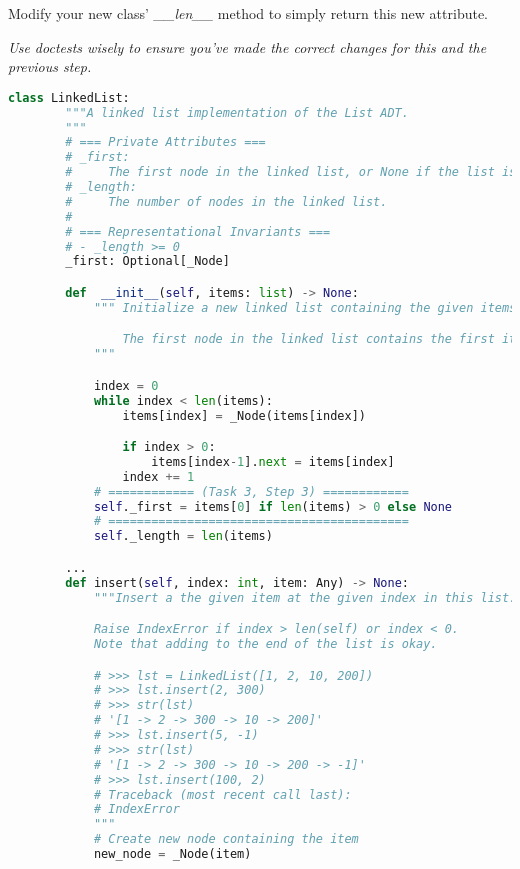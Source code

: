 \documentclass[12pt]{article}
\begin{document}
\begin{enumerate}[1.]
    \bigskip

    Modify your new class’ \textit{\_\_len\_\_} method to simply return this new
    attribute.

    \textit{Use doctests wisely to ensure you’ve made the correct changes for this and the previous step.}

    \bigskip

    \begin{mdframed}
    \begin{lstlisting}[language=python,caption={task\_3\_step\_3\_solution.py}]
        class LinkedList:
        """A linked list implementation of the List ADT.
        """
        # === Private Attributes ===
        # _first:
        #     The first node in the linked list, or None if the list is empty.
        # _length:
        #     The number of nodes in the linked list.
        #
        # === Representational Invariants ===
        # - _length >= 0
        _first: Optional[_Node]

        def  __init__(self, items: list) -> None:
            """ Initialize a new linked list containing the given items.

                The first node in the linked list contains the first item in <items>
            """

            index = 0
            while index < len(items):
                items[index] = _Node(items[index])

                if index > 0:
                    items[index-1].next = items[index]
                index += 1
            # ============ (Task 3, Step 3) ============
            self._first = items[0] if len(items) > 0 else None
            # ==========================================
            self._length = len(items)

        ...
        def insert(self, index: int, item: Any) -> None:
            """Insert a the given item at the given index in this list.

            Raise IndexError if index > len(self) or index < 0.
            Note that adding to the end of the list is okay.

            # >>> lst = LinkedList([1, 2, 10, 200])
            # >>> lst.insert(2, 300)
            # >>> str(lst)
            # '[1 -> 2 -> 300 -> 10 -> 200]'
            # >>> lst.insert(5, -1)
            # >>> str(lst)
            # '[1 -> 2 -> 300 -> 10 -> 200 -> -1]'
            # >>> lst.insert(100, 2)
            # Traceback (most recent call last):
            # IndexError
            """
            # Create new node containing the item
            new_node = _Node(item)


\end{lstlisting}
\end{mdframed}
\end{enumerate}
\end{document}

